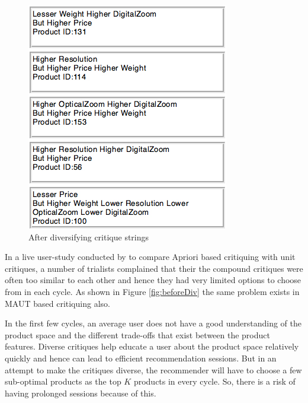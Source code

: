 \begin{figure}
\begin{minipage}{.45\textwidth}
  \includegraphics[width=1\linewidth]{figures-bharath/diversity2.jpg}
  \caption{After diversifying critique strings}
  \label{fig:afterDiv}
\end{minipage}
\end{figure}

In a live user-study conducted by \cite{aprioriUserStudy} to compare Apriori based critiquing with unit critiques, a number of trialists complained that their the compound critiques were often too similar to each other and hence they had very limited options to choose from in each cycle.
As shown in Figure \ref{fig:beforeDiv} the same problem exists in MAUT based critiquing also.

In the first few cycles, an average user does not have a good understanding of the product space and the different trade-offs that exist between the product features.
Diverse critiques help educate a user about the product space relatively quickly and hence can lead to efficient recommendation sessions.
But in an attempt to make the critiques diverse, the recommender will have to choose a few sub-optimal products as the top $K$ products in every cycle.
So, there is a risk of having prolonged sessions because of this.

